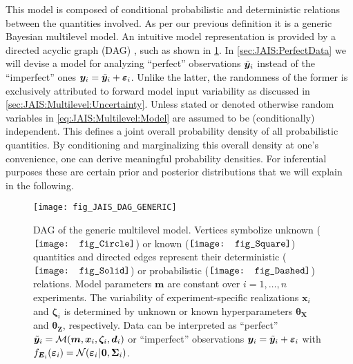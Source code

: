 \par %
This model is composed of conditional probabilistic and deterministic relations between the quantities involved.
As per our previous definition it is a generic Bayesian multilevel model.
An intuitive model representation is provided by a directed acyclic graph (DAG) \cite{Bayesian:Koski2009,Bayesian:Kjaerulff2013}, such as shown in \cref{fig:JAIS:Multilevel:DAG}.
In \cref{sec:JAIS:PerfectData} we will devise a model for analyzing ``perfect'' observations \(\tilde{\bm{y}}_i\) instead of the ``imperfect'' ones \(\bm{y}_i = \tilde{\bm{y}}_i + \bm{\varepsilon}_i\).
Unlike the latter, the randomness of the former is exclusively attributed to forward model input variability as discussed in \cref{sec:JAIS:Multilevel:Uncertainty}.
Unless stated or denoted otherwise random variables in \cref{eq:JAIS:Multilevel:Model} are assumed to be (conditionally) independent.
This defines a joint overall probability density of all probabilistic quantities.
By conditioning and marginalizing this overall density at one's convenience, one can derive meaningful probability densities.
For inferential purposes these are certain prior and posterior distributions that we will explain in the following.
\begin{figure}[htbp]
  \centering
  \texttt{[image: fig\_JAIS\_DAG\_GENERIC]}
  \caption[DAG of the generic multilevel model]{DAG of the generic multilevel model.
           Vertices symbolize unknown (\(\vcenter{\hbox{\protect\texttt{[image: fig\_Circle]}}}\))
           or known (\(\vcenter{\hbox{\protect\texttt{[image: fig\_Square]}}}\)) quantities
           and directed edges represent their deterministic (\(\vcenter{\hbox{\protect\texttt{[image: fig\_Solid]}}}\))
           or probabilistic (\(\vcenter{\hbox{\protect\texttt{[image: fig\_Dashed]}}}\)) relations.
           Model parameters \(\bm{m}\) are constant over \(i=1,\ldots,n\) experiments.
           The variability of experiment-specific realizations \(\bm{x}_i\) and \(\bm{\zeta}_i\) is determined
           by unknown or known hyperparameters \(\bm{\theta}_{\bm{X}}\) and \(\bm{\theta}_{\bm{Z}}\), respectively.
           Data can be interpreted as ``perfect'' \(\tilde{\bm{y}}_i = \mathcal{M}(\bm{m},\bm{x}_i,\bm{\zeta}_i,\bm{d}_i)\)
           or ``imperfect'' observations \(\bm{y}_i = \tilde{\bm{y}}_i + \bm{\varepsilon}_i\) with
           \(f_{\bm{E}_i}(\bm{\varepsilon}_i) = \mathcal{N}(\bm{\varepsilon}_i {\:\!}|{\:\!} \bm{0},\bm{\Sigma}_i)\).
          }
  \label{fig:JAIS:Multilevel:DAG}
\end{figure}

